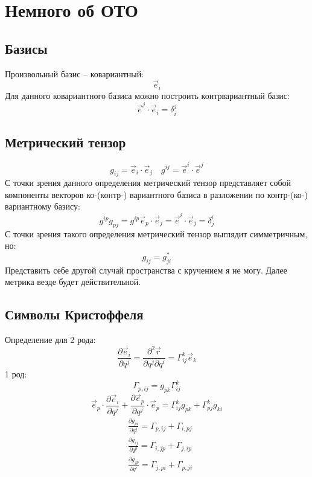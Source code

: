 \section{Немного об ОТО}

\subsection{Базисы}

Произвольный базис -- ковариантный:
\[
	\vec{e}_i
\]
Для данного ковариантного базиса можно построить контрвариантный базис:
\[
	\vec{e}^j \cdot \vec{e}_i = \delta^j_i
\] 

\subsection{Метрический тензор}

\[
	g_{ij} = \vec{e}_i \cdot \vec{e}_j
	\quad
	g^{ij} = \vec{e}^i \cdot \vec{e}^j
\]
С точки зрения данного определения метрический тензор представляет собой компоненты векторов ко-(контр-) вариантного базиса в разложении по контр-(ко-)  вариантному базису:
\[
	g^{ip} g_{pj} = g^{ip} \vec{e}_p \cdot \vec{e}_j = \vec{e}^i \cdot \vec{e}_j = \delta^i_j
\]
С точки зрения такого определения метрический тензор выглядит симметричным, но:
\[
	g_{ij} = g^*_{ji}
\]
Представить себе другой случай пространства с кручением я не могу. Далее метрика везде будет действительной.

\subsection{Символы Кристоффеля}

Определение для 2 рода:
\[
	\frac{\partial \vec{e}_i}{\partial q^j} = \frac{\partial^2 \vec{r}}{\partial q^j \partial q^i} = \Gamma^k_{ij} \vec{e}_k
\]
1 род:
\[
	\Gamma_{p, ij} = g_{pk} \Gamma^{k}_{ij}
\]
\[
	\vec{e}_p \cdot \frac{\partial \vec{e}_i}{\partial q^j} + 
	\frac{\partial \vec{e}_p}{\partial q^j} \cdot \vec{e}_p =
	\Gamma_{ij}^k g_{pk} + \Gamma^k_{pj} g_{ki}
\]
\[
	\begin{aligned}
	& \frac{\partial g_{pi}}{\partial q^j} = \Gamma_{p,ij} + \Gamma_{i,pj} \\
	& \frac{\partial g_{ij}}{\partial q^p} = \Gamma_{i,jp} + \Gamma_{j,ip} \\
	& \frac{\partial g_{jp}}{\partial q^i} = \Gamma_{j,pi} + \Gamma_{p,ji}
	\end{aligned}
\]